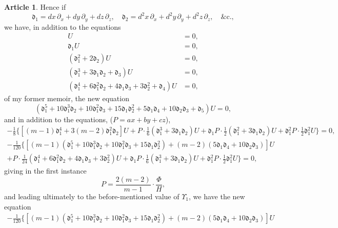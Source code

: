 \documentclass[12pt,a4paper]{article}
\theoremstyle{definition}
\newtheorem{art}{Article}[section]
\begin{document}
\begin{art}
Hence if
\[
\mathfrak{d}_1 = dx\,\partial_x + dy\,\partial_y + dz\,\partial_z, \quad \mathfrak{d}_2 = d^2x\,\partial_x + d^2y\,\partial_y + d^2z\,\partial_z, \quad \text{\&c.},
\]
we have, in addition to the equations
\begin{align*}
U &= 0, \\
\mathfrak{d}_1 U &= 0, \\
(\mathfrak{d}_1^2 + 2\mathfrak{d}_2)U &= 0, \\
(\mathfrak{d}_1^3 + 3\mathfrak{d}_1\mathfrak{d}_2 + \mathfrak{d}_3)U &= 0, \\
(\mathfrak{d}_1^4 + 6\mathfrak{d}_1^2\mathfrak{d}_2 + 4\mathfrak{d}_1\mathfrak{d}_3 + 3\mathfrak{d}_2^2 + \mathfrak{d}_4)U &= 0,
\end{align*}
of my former memoir, the new equation
\[
(\mathfrak{d}_1^5 + 10\mathfrak{d}_1^3\mathfrak{d}_2 + 10\mathfrak{d}_1^2\mathfrak{d}_3 + 15\mathfrak{d}_1\mathfrak{d}_2^2 + 5\mathfrak{d}_1\mathfrak{d}_4 + 10\mathfrak{d}_2\mathfrak{d}_3 + \mathfrak{d}_5)U = 0,
\]
and in addition to the equations, ($P = ax + by + cz$),
\begin{multline*}
-\tfrac{1}{8}\{[(m - 1)\mathfrak{d}_1^4 + 3(m - 2)\mathfrak{d}_1^2\mathfrak{d}_2]U + P \cdot \tfrac{1}{6}(\mathfrak{d}_1^3 + 3\mathfrak{d}_1\mathfrak{d}_2)U + \mathfrak{d}_1 P \cdot \tfrac{1}{2}(\mathfrak{d}_1^2 + 3\mathfrak{d}_1\mathfrak{d}_2)U + \mathfrak{d}_1^2 P \cdot \tfrac{1}{2}\mathfrak{d}_1^2 U\} = 0,
\end{multline*}
\begin{multline*}
-\tfrac{1}{120}\{[(m - 1)(\mathfrak{d}_1^5 + 10\mathfrak{d}_1^3\mathfrak{d}_2 + 10\mathfrak{d}_1^2\mathfrak{d}_3 + 15\mathfrak{d}_1\mathfrak{d}_2^2) + (m - 2)(5\mathfrak{d}_1\mathfrak{d}_4 + 10\mathfrak{d}_2\mathfrak{d}_3)]U \\
+ P \cdot \tfrac{1}{24}(\mathfrak{d}_1^4 + 6\mathfrak{d}_1^2\mathfrak{d}_2 + 4\mathfrak{d}_1\mathfrak{d}_3 + 3\mathfrak{d}_2^2)U + \mathfrak{d}_1 P \cdot \tfrac{1}{6}(\mathfrak{d}_1^3 + 3\mathfrak{d}_1\mathfrak{d}_2)U + \mathfrak{d}_1^2 P \cdot \tfrac{1}{2}\mathfrak{d}_1^2 U\} = 0,
\end{multline*}
giving in the first instance
\[
P = \frac{2(m - 2)}{m - 1} \cdot \frac{\Phi}{H},
\]
and leading ultimately to the before-mentioned value of $\Upsilon_1$, we have the new equation
\begin{multline*}
-\tfrac{1}{120}\{[(m - 1)(\mathfrak{d}_1^5 + 10\mathfrak{d}_1^3\mathfrak{d}_2 + 10\mathfrak{d}_1^2\mathfrak{d}_3 + 15\mathfrak{d}_1\mathfrak{d}_2^2) + (m - 2)(5\mathfrak{d}_1\mathfrak{d}_4 + 10\mathfrak{d}_2\mathfrak{d}_3)]U \\

\end{multline*}
\end{art}
\end{document}
